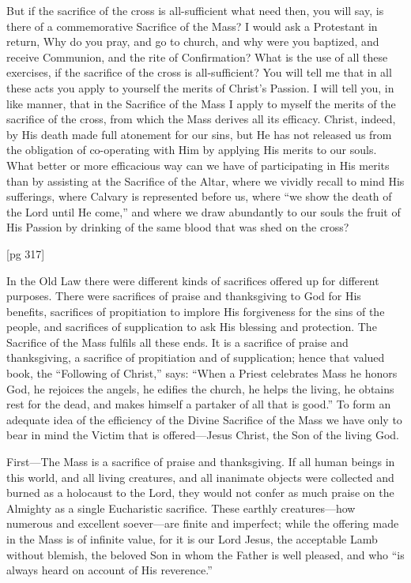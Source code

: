 But if the sacrifice of the cross is all-sufficient
what need then, you will say, is there of a commemorative
Sacrifice of the Mass? I would ask a
Protestant in return, Why do you pray, and go to
church, and why were you baptized, and receive
Communion, and the rite of Confirmation? What
is the use of all these exercises, if the sacrifice of
the cross is all-sufficient? You will tell me that in
all these acts you apply to yourself the merits of
Christ's Passion. I will tell you, in like manner,
that in the Sacrifice of the Mass I apply to myself
the merits of the sacrifice of the cross, from which
the Mass derives all its efficacy. Christ, indeed, by
His death made full atonement for our sins, but He
has not released us from the obligation of co-operating
with Him by applying His merits to our
souls. What better or more efficacious way can we
have of participating in His merits than by assisting
at the Sacrifice of the Altar, where we
vividly recall to mind His sufferings, where Calvary
is represented before us, where “we show
the death of the Lord until He come,” and where
we draw abundantly to our souls the fruit of His
Passion by drinking of the same blood that was
shed on the cross?

[pg 317]

In the Old Law there were different kinds of
sacrifices offered up for different purposes. There
were sacrifices of praise and thanksgiving to God
for His benefits, sacrifices of propitiation to implore
His forgiveness for the sins of the people,
and sacrifices of supplication to ask His blessing
and protection. The Sacrifice of the Mass fulfils
all these ends. It is a sacrifice of praise and
thanksgiving, a sacrifice of propitiation and of
supplication; hence that valued book, the “Following
of Christ,” says: “When a Priest celebrates
Mass he honors God, he rejoices the angels, he
edifies the church, he helps the living, he obtains
rest for the dead, and makes himself a partaker
of all that is good.” To form an adequate
idea of the efficiency of the Divine Sacrifice of the
Mass we have only to bear in mind the Victim that
is offered—Jesus Christ, the Son of the living
God.

First—The Mass is a sacrifice of praise and
thanksgiving. If all human beings in this world,
and all living creatures, and all inanimate objects
were collected and burned as a holocaust to the
Lord, they would not confer as much praise on the
Almighty as a single Eucharistic sacrifice. These
earthly creatures—how numerous and excellent
soever—are finite and imperfect; while the offering
made in the Mass is of infinite value, for it is
our Lord Jesus, the acceptable Lamb without
blemish, the beloved Son in whom the Father is
well pleased, and who “is always heard on account
of His reverence.”

